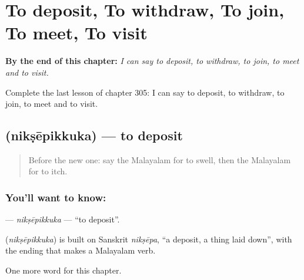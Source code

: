 
\chapter{To deposit, To withdraw, To join, To meet, To visit}
\label{ch:ml-to-deposit-to-withdraw-to-join-to-meet-to-visit}

\begin{chapteropening}
\textbf{By the end of this chapter:} \emph{I can say to deposit, to withdraw, to join, to meet and to visit.}

Complete the last lesson of chapter 305: I can say to deposit, to withdraw, to join, to meet and to visit.
\end{chapteropening}

\section[\texorpdfstring{\ml{നിക്ഷേപിക്കുക} (nikṣēpikkuka)}{നിക്ഷേപിക്കുക (nikṣēpikkuka)}]{ (nikṣēpikkuka) — to deposit}

\label{lesson:ML-C305-niksepikkuka}



\begin{quote}
Before the new one: say the Malayalam for to swell, then the Malayalam for to itch.
\end{quote}

\subsection*{You'll want to know: }
\textbf{} — \emph{nikṣēpikkuka} — \textquotedblleft{}to deposit\textquotedblright{}.

\begin{cousinweb}
\textbf{} (\emph{nikṣēpikkuka}) is built on Sanskrit \emph{nikṣēpa}, \textquotedblleft{}a deposit, a thing laid down\textquotedblright{}, with the ending that makes a Malayalam verb.
\end{cousinweb}

\begin{grammarlens}[title={What you've built}]
One more word for this chapter.
\end{grammarlens}

